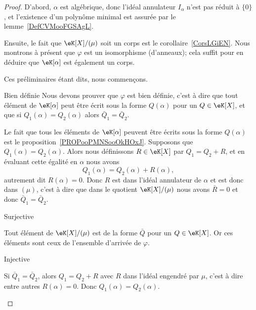 \begin{proof}
    D'abord, \( \alpha\) est algébrique, donc l'idéal annulateur \( I_{\alpha}\) n'est pas réduit à \( \{ 0 \}\), et l'existence d'un polynôme minimal est assurée par le lemme~\ref{DefCVMooFGSAgL}.

    Ensuite, le fait que \( \eK[X]/(\mu)\) soit un corps est le corollaire~\ref{CorsLGiEN}. Nous montrons à présent que \( \varphi\) est un isomorphisme (d'anneaux); cela suffit pour en déduire que \( \eK[\alpha]\) est également un corps.

    Ces préliminaires étant dits, nous commençons.
    \begin{subproof}
        \item[Bien définie]
            Nous devons prouver que \( \varphi\) est bien définie, c'est à dire que tout élément de \( \eK[\alpha]\) peut être écrit sous la forme \( Q(\alpha)\) pour un \( Q\in \eK[X]\), et que si \( Q_1(\alpha)=Q_2(\alpha)\) alors \( \bar Q_1=\bar Q_2\).

            Le fait que tous les éléments de \( \eK[\alpha]\) peuvent être écrits sous la forme \( Q(\alpha)\) est le proposition~\ref{PROPooPMNSooOkHOxJ}. Supposons que \( Q_1(\alpha)=Q_2(\alpha)\). Alors nous définissons \( R\in \eK[X]\) par \( Q_1=Q_2+R\), et en évaluant cette égalité en \( \alpha\) nous avons
            \begin{equation}
                Q_1(\alpha)=Q_2(\alpha)+R(\alpha),
            \end{equation}
            autrement dit \( R(\alpha)=0\). Donc \( R\) est dans l'idéal annulateur de \( \alpha\) et est donc dans \( (\mu)\), c'est à dire que dans le quotient \( \eK[X]/(\mu)\) nous avons \( \bar R=0\) et donc \( \bar Q_1=\bar Q_2\).

        \item[Surjective]

            Tout élément de \( \eK[X]/(\mu)\) est de la forme \( \bar Q\) pour un \( Q\in \eK[X]\). Or ces éléments sont ceux de l'ensemble d'arrivée de \( \varphi\).

        \item[Injective]

            Si \( \bar Q_1=\bar Q_2\), alors \( Q_1=Q_2+R\) avec \( R\) dans l'idéal engendré par \( \mu\), c'est à dire entre autres \( R(\alpha)=0\). Donc \( Q_1(\alpha)=Q_2(\alpha)\).

    \end{subproof}


\end{proof}
